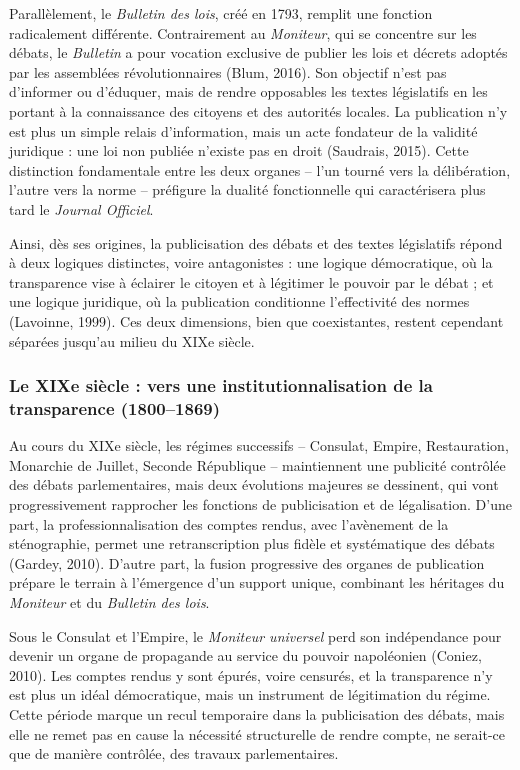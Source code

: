 Parallèlement, le \emph{Bulletin des lois}, créé en 1793, remplit une fonction radicalement différente. Contrairement au \emph{Moniteur}, qui se concentre sur les débats, le \emph{Bulletin} a pour vocation exclusive de publier les lois et décrets adoptés par les assemblées révolutionnaires (Blum, 2016). Son objectif n’est pas d’informer ou d’éduquer, mais de rendre opposables les textes législatifs en les portant à la connaissance des citoyens et des autorités locales. La publication n’y est plus un simple relais d’information, mais un acte fondateur de la validité juridique : une loi non publiée n’existe pas en droit (Saudrais, 2015). Cette distinction fondamentale entre les deux organes – l’un tourné vers la délibération, l’autre vers la norme – préfigure la dualité fonctionnelle qui caractérisera plus tard le \emph{Journal Officiel}.

Ainsi, dès ses origines, la publicisation des débats et des textes législatifs répond à deux logiques distinctes, voire antagonistes : une logique démocratique, où la transparence vise à éclairer le citoyen et à légitimer le pouvoir par le débat ; et une logique juridique, où la publication conditionne l’effectivité des normes (Lavoinne, 1999). Ces deux dimensions, bien que coexistantes, restent cependant séparées jusqu’au milieu du XIXe siècle.

\subsubsection{Le XIXe siècle : vers une institutionnalisation de la transparence (1800–1869)}

Au cours du XIXe siècle, les régimes successifs – Consulat, Empire, Restauration, Monarchie de Juillet, Seconde République – maintiennent une publicité contrôlée des débats parlementaires, mais deux évolutions majeures se dessinent, qui vont progressivement rapprocher les fonctions de publicisation et de légalisation. D’une part, la professionnalisation des comptes rendus, avec l’avènement de la sténographie, permet une retranscription plus fidèle et systématique des débats (Gardey, 2010). D’autre part, la fusion progressive des organes de publication prépare le terrain à l’émergence d’un support unique, combinant les héritages du \emph{Moniteur} et du \emph{Bulletin des lois}.

Sous le Consulat et l’Empire, le \emph{Moniteur universel} perd son indépendance pour devenir un organe de propagande au service du pouvoir napoléonien (Coniez, 2010). Les comptes rendus y sont épurés, voire censurés, et la transparence n’y est plus un idéal démocratique, mais un instrument de légitimation du régime. Cette période marque un recul temporaire dans la publicisation des débats, mais elle ne remet pas en cause la nécessité structurelle de rendre compte, ne serait-ce que de manière contrôlée, des travaux parlementaires.

